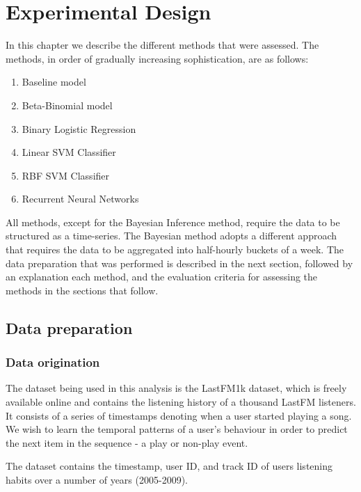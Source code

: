 
\chapter{Experimental Design}

\label{Chapter4} %

In this chapter we describe the different methods that were assessed. The methods, in order of gradually increasing sophistication, are as follows:

\begin{enumerate}
    \item Baseline model
	\item Beta-Binomial model
	\item Binary Logistic Regression
	\item Linear SVM Classifier
	\item RBF SVM Classifier
	\item Recurrent Neural Networks
\end{enumerate}

All methods, except for the Bayesian Inference method, require the data to be structured as a time-series. The Bayesian method adopts a different approach that requires the data to be aggregated into half-hourly buckets of a week. The data preparation that was performed is described in the next section, followed by an explanation each method, and the evaluation criteria for assessing the methods in the sections that follow.

\section{Data preparation}

\subsection{Data origination}

The dataset being used in this analysis is the LastFM1k dataset, which is freely available online and contains the listening history of a thousand LastFM listeners. It consists of a series of timestamps denoting when a user started playing a song. We wish to learn the temporal patterns of a user's behaviour in order to predict the next item in the sequence - a play or non-play event. 

The dataset contains the timestamp, user ID, and track ID of users listening habits over a number of years (2005-2009).

